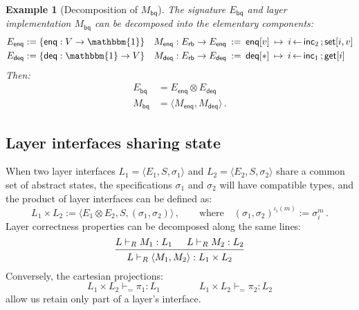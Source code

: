 \documentclass[draft,11pt]{report}
\newtheorem{example}[theorem]{Example}
\theoremstyle{definition}
\newcommand{\kw}[1]{\ensuremath{ \mathsf{#1} }}
\begin{document}
\begin{example}[Decomposition of $M_\kw{bq}$]
The signature $E_\kw{bq}$ and layer implementation $M_\kw{bq}$
can be decomposed into the elementary components:
\begin{align*}
  E_\kw{enq} &:= \{ \kw{enq} : V \rightarrow \mathbbm{1} \} &
  M_\kw{enq} : E_\kw{rb} \rightarrow E_\kw{enq} \: &:= \:
    \kw{enq}[v] \: \mapsto \:
      i \mathop{\leftarrow} \kw{inc}_2 \mathop{;}
      \kw{set}[i, v] \\
  E_\kw{deq} &:= \{ \kw{deq} : \mathbbm{1} \rightarrow V \} &
  M_\kw{deq} : E_\kw{rb} \rightarrow E_\kw{deq} \: &:= \:
    \kw{deq}[*] \:\mapsto\:
      i \mathop{\leftarrow} \kw{inc}_1 \mathop{;}
      \kw{get}[i]
\end{align*}
Then:
\begin{align*}
  E_\kw{bq} &= E_\kw{enq} \otimes E_\kw{deq} \\
  M_\kw{bq} &= \langle M_\kw{enq}, M_\kw{deq} \rangle \,.
\end{align*}
\end{example}


\subsection{Layer interfaces sharing state} %

When two layer interfaces
$L_1 = \langle E_1, S, \sigma_1 \rangle$ and
$L_2 = \langle E_2, S, \sigma_2 \rangle$
share a common set of abstract states,
the specifications $\sigma_1$ and $\sigma_2$
will have compatible types,
and the product of layer interfaces can be defined as:
\[
  L_1 \times L_2 :=
    \langle E_1 \otimes E_2, S, (\sigma_1, \sigma_2) \rangle \,,
  \qquad
  \text{where}
  \quad
  (\sigma_1, \sigma_2)^{\iota_i(m)} := \sigma_i^m \,.
\]
Layer correctness properties can be
decomposed along the same lines:
\[
  \begin{prooftree}
    \hypo{L \vdash_R M_1 : L_1}
    \hypo{L \vdash_R M_2 : L_2}
    \infer2{L \vdash_R \langle M_1, M_2 \rangle : L_1 \times L_2}
  \end{prooftree}
\]
Conversely, the cartesian projections:
\[
   L_1 \times L_2 \vdash_{=} \pi_1 : L_1 \qquad \qquad
   L_1 \times L_2 \vdash_{=} \pi_2 : L_2
\]
allow us retain only part of a layer's interface.
\end{document}
